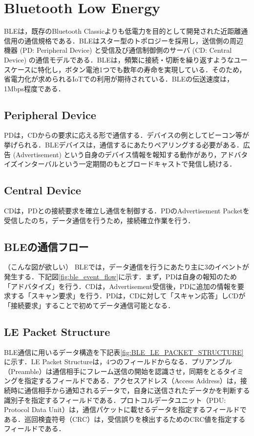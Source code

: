 \section{Bluetooth Low Energy}
BLEは，既存のBluetooth Classicよりも低電力を目的として開発された近距離通信用の通信規格である．BLEはスター型のトポロジーを採用し，送信側の周辺機器 (PD: Peripheral Device) と受信及び通信制御側のサーバ (CD: Central Device) の通信モデルである．BLEは，頻繁に接続・切断を繰り返すようなユースケースに特化し，ボタン電池1つでも数年の寿命を実現している．そのため，省電力化が求められるIoTでの利用が期待されている．BLEの伝送速度は，1Mbps程度である．

\subsection{Peripheral Device}
PDは，CDからの要求に応える形で通信する．デバイスの例としてビーコン等が挙げられる．BLEデバイスは，通信するにあたりペアリングする必要がある．広告 (Advertisement) という自身のデバイス情報を報知する動作があり，アドバタイズインターバルという一定期間のもとブロードキャストで発信し続ける．

\subsection{Central Device}
CDは，PDとの接続要求を確立し通信を制御する．PDのAdvertisement Packetを受信したのち，データ通信を行うため，接続確立作業を行う．

\subsection{BLEの通信フロー}
（こんな図が欲しい）
BLEでは，データ通信を行うにあたり主に3のイベントが発生する．下記図\ref{fig:ble_event_flow}に示す．まず，PDは自身の報知のため「アドバタイズ」を行う．CDは，Advertisement受信後，PDに追加の情報を要求する「スキャン要求」を行う．PDは，CDに対して「スキャン応答」しCDが「接続要求」することで初めてデータ通信可能となる．

\subsection{LE Packet Structure}
BLE通信に用いるデータ構造を下記表\ref{fig:BLE_LE_PACKET_STRUCTURE}に示す．LE Packet Structureは，4つのフィールドからなる．プリアンブル（Preamble）は通信相手にフレーム送信の開始を認識させ，同期をとるタイミングを指定するフィールドである．アクセスアドレス（Access Address）は，接続時に通信相手から通知されるデータで，自身に送信されたデータかを判断する識別子を指定するフィールドである．プロトコルデータユニット（PDU: Protocol Data Unit）は，通信パケットに載せるデータを指定するフィールドである．巡回検査符号（CRC）は，受信誤りを検出するためのCRC値を指定するフィールドである．

